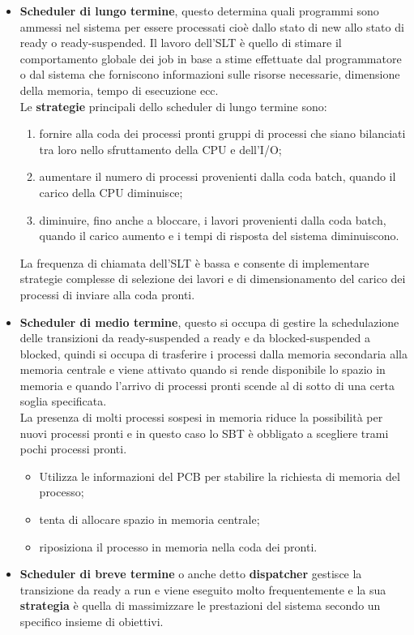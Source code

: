 \documentclass[12pt, letterpaper]{report}
\begin{document}
	\begin{itemize}
		\item \textbf{Scheduler di lungo termine}, questo determina quali programmi sono ammessi nel sistema per essere processati cioè dallo stato di new allo stato di ready o ready-suspended. Il lavoro dell'SLT è quello di stimare il comportamento globale dei job in base a stime effettuate dal programmatore o dal sistema che forniscono informazioni sulle risorse necessarie, dimensione della memoria, tempo di esecuzione ecc. \\
		Le \textbf{strategie} principali dello scheduler di lungo termine sono:
		\begin{enumerate}
			\item fornire alla coda dei processi pronti gruppi di processi che siano bilanciati tra loro nello sfruttamento della CPU e dell'I/O;
			\item aumentare il numero di processi provenienti dalla coda batch, quando il carico della CPU diminuisce;
			\item diminuire, fino anche a bloccare, i lavori provenienti dalla coda batch, quando il carico aumento e i tempi di risposta del sistema diminuiscono.
		\end{enumerate}
		La frequenza di chiamata dell'SLT è bassa e consente di implementare strategie complesse di selezione dei lavori e di dimensionamento del carico dei processi di inviare alla coda pronti.
		\item \textbf{Scheduler di medio termine}, questo si occupa di gestire la schedulazione delle transizioni da ready-suspended a ready e da blocked-suspended a blocked, quindi si occupa di trasferire i processi dalla memoria secondaria alla memoria centrale e viene attivato quando si rende disponibile lo spazio in memoria e quando l'arrivo di processi pronti scende al di sotto di una certa soglia specificata. \\
		La presenza di molti processi sospesi in memoria riduce la possibilità per nuovi processi pronti e in questo caso lo SBT è obbligato a scegliere trami pochi processi pronti.
		\begin{itemize}
			\item Utilizza le informazioni del PCB per stabilire la richiesta di memoria del processo;
			\item tenta di allocare spazio in memoria centrale;
			\item riposiziona il processo in memoria nella coda dei pronti.
		\end{itemize}
		\item \textbf{Scheduler di breve termine} o anche detto \textbf{dispatcher} gestisce la transizione da ready a run e viene eseguito molto frequentemente e la sua \textbf{strategia} è quella di massimizzare le prestazioni del sistema secondo un specifico insieme di obiettivi. \\

\end{itemize}
\end{document}
